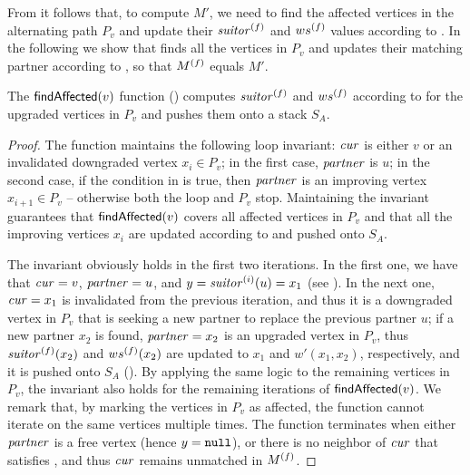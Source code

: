 From  it follows that, to compute $M'$, we need
to find the affected vertices in the alternating path $P_v$ and update their
$\mathit{suitor}^{(f)}$ and $ws^{(f)}$ values according to . In the
following we show that  finds all the vertices
in $P_v$ and updates their matching partner according to ,
so that $M^{(f)}$ equals $M'$.


\begin{proposition}
\label{prop:dyn-mwm:find-aff-correctness}
The $\textsf{findAffected}(v)$ function () computes
$\mathit{suitor}^{(f)}$ and $ws^{(f)}$ according to  for the upgraded
vertices in $P_v$ and pushes them onto a stack $S_A$.
\end{proposition}
%
\begin{proof}
The function maintains the following loop invariant:
$\mathit{cur}$ is either $v$ or an invalidated downgraded vertex $x_i \in P_v$;
in the first case, $\mathit{partner}$ is $u$; in the second case, if the condition in
 is true, then $\mathit{partner}$ is an improving
vertex $x_{i + 1} \in P_v$ -- otherwise both the loop and $P_v$ stop.
Maintaining the invariant guarantees that $\textsf{findAffected}(v)$ covers all affected vertices in $P_v$
and that all the improving vertices $x_i$ are updated according to 
and pushed onto $S_A$.

The invariant obviously holds in the first two iterations.
In the first one, we have that $\mathit{cur} = v$,
$\mathit{partner} = u$, and $y = \mathit{suitor}^{(i)}(u) = x_1$
(see ). In the next one, $\mathit{cur} = x_1$ is invalidated from
the previous iteration, and thus it is a downgraded vertex in $P_v$
that is seeking a new partner to replace the previous partner $u$;
if a new partner $x_2$ is found, $\mathit{partner} = x_2$ is an upgraded vertex in
$P_v$, thus $\mathit{suitor}^{(f)}(x_2)$ and $ws^{(f)}(x_2)$
are updated to $x_1$ and $w'(x_1, x_2)$,
respectively, and it is pushed onto $S_A$
().
By applying the same logic to the remaining vertices in $P_v$,
the invariant also holds for the remaining iterations of $\textsf{findAffected}(v)$.
We remark that, by marking the vertices in $P_v$ as affected, the function cannot
iterate on the same vertices multiple times.
The function terminates when either $\mathit{partner}$ is a free vertex (hence $y
= \texttt{null}$), or there is no neighbor of $\mathit{cur}$ that satisfies , and
thus $\mathit{cur}$ remains unmatched in $M^{(f)}$.
\end{proof}


